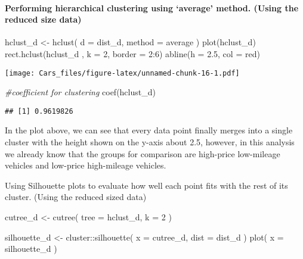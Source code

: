 \documentclass[
]{article}
\newenvironment{Shaded}{\begin{snugshade}}{\end{snugshade}}
\newcommand{\AttributeTok}[1]{\textcolor[rgb]{0.77,0.63,0.00}{#1}}
\newcommand{\CommentTok}[1]{\textcolor[rgb]{0.56,0.35,0.01}{\textit{#1}}}
\newcommand{\DecValTok}[1]{\textcolor[rgb]{0.00,0.00,0.81}{#1}}
\newcommand{\FloatTok}[1]{\textcolor[rgb]{0.00,0.00,0.81}{#1}}
\newcommand{\FunctionTok}[1]{\textcolor[rgb]{0.00,0.00,0.00}{#1}}
\newcommand{\NormalTok}[1]{#1}
\newcommand{\OtherTok}[1]{\textcolor[rgb]{0.56,0.35,0.01}{#1}}
\newcommand{\SpecialCharTok}[1]{\textcolor[rgb]{0.00,0.00,0.00}{#1}}
\newcommand{\StringTok}[1]{\textcolor[rgb]{0.31,0.60,0.02}{#1}}
\begin{document}
\hypertarget{performing-hierarchical-clustering-using-average-method.-using-the-reduced-size-data}{%
\paragraph{Performing hierarchical clustering using `average' method.
(Using the reduced size
data)}\label{performing-hierarchical-clustering-using-average-method.-using-the-reduced-size-data}}

\begin{Shaded}
\begin{Highlighting}[]
\NormalTok{hclust\_d }\OtherTok{\textless{}{-}} \FunctionTok{hclust}\NormalTok{(}
  \AttributeTok{d =}\NormalTok{ dist\_d,}
  \AttributeTok{method =} \StringTok{\textquotesingle{}average\textquotesingle{}}
\NormalTok{)}
\FunctionTok{plot}\NormalTok{(hclust\_d)}
\FunctionTok{rect.hclust}\NormalTok{(hclust\_d , }\AttributeTok{k =} \DecValTok{2}\NormalTok{, }\AttributeTok{border =} \DecValTok{2}\SpecialCharTok{:}\DecValTok{6}\NormalTok{)}
\FunctionTok{abline}\NormalTok{(}\AttributeTok{h =} \FloatTok{2.5}\NormalTok{, }\AttributeTok{col =} \StringTok{\textquotesingle{}red\textquotesingle{}}\NormalTok{)}
\end{Highlighting}
\end{Shaded}

\texttt{[image: Cars\_files/figure-latex/unnamed-chunk-16-1.pdf]}

\begin{Shaded}
\begin{Highlighting}[]
\CommentTok{\#coefficient for clustering}
\FunctionTok{coef}\NormalTok{(hclust\_d)}
\end{Highlighting}
\end{Shaded}

\begin{verbatim}
## [1] 0.9619826
\end{verbatim}

In the plot above, we can see that every data point finally merges into
a single cluster with the height shown on the y-axis about 2.5, however,
in this analysis we already know that the groups for comparison are
high-price low-mileage vehicles and low-price high-mileage vehicles.

Using Silhouette plots to evaluate how well each point fits with the
rest of its cluster. (Using the reduced sized data)

\begin{Shaded}
\begin{Highlighting}[]
\NormalTok{cutree\_d }\OtherTok{\textless{}{-}} \FunctionTok{cutree}\NormalTok{(}
  \AttributeTok{tree =}\NormalTok{ hclust\_d,}
  \AttributeTok{k =} \DecValTok{2}
\NormalTok{)}

\NormalTok{silhouette\_d }\OtherTok{\textless{}{-}}\NormalTok{ cluster}\SpecialCharTok{::}\FunctionTok{silhouette}\NormalTok{(}
  \AttributeTok{x =}\NormalTok{ cutree\_d,}
  \AttributeTok{dist =}\NormalTok{ dist\_d}
\NormalTok{)}
\FunctionTok{plot}\NormalTok{(}
  \AttributeTok{x =}\NormalTok{ silhouette\_d}
\NormalTok{)}
\end{Highlighting}
\end{Shaded}
\end{document}
